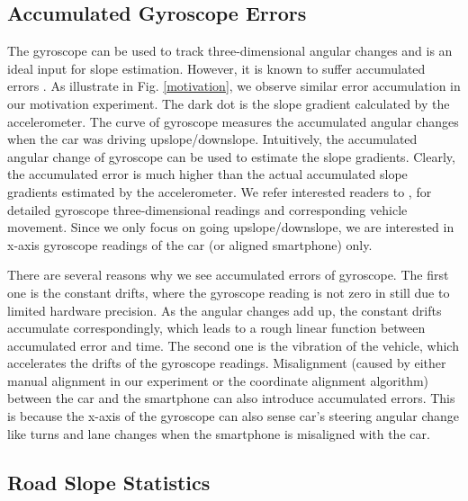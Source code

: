 \subsection{Accumulated Gyroscope Errors}

The gyroscope can be used to track three-dimensional angular changes
and is an ideal input for slope estimation. 
However, it is known to suffer accumulated errors \cite{zhou2014use}. 
As illustrate in Fig. \ref{motivation}, 
we observe similar error accumulation in our motivation experiment. 
The dark dot is the slope gradient calculated by the accelerometer.
The curve of gyroscope measures the accumulated angular changes  
when the car was driving upslope/downslope.
Intuitively, the accumulated angular change of gyroscope can be used to 
estimate the slope gradients.
Clearly, the accumulated error is much higher than 
the actual accumulated slope gradients estimated by the accelerometer. 
We refer interested readers to \cite{chen2015invisible, zhou2014use},  
for detailed gyroscope three-dimensional readings 
and corresponding vehicle movement. 
Since we only focus on going upslope/downslope, we are interested in 
x-axis gyroscope readings of the car (or aligned smartphone) only.

There are several reasons why we see accumulated errors of gyroscope. 
The first one is the constant drifts, where the gyroscope reading is 
not zero in still due to limited hardware precision.
As the angular changes add up, the constant drifts accumulate correspondingly, 
which leads to a rough linear function between accumulated error and time.
The second one is the vibration of the vehicle, which accelerates
the drifts of the gyroscope readings.
Misalignment (caused by either manual alignment in our experiment 
or the coordinate alignment algorithm) between the car and the smartphone can also introduce accumulated errors. 
This is because the x-axis of the gyroscope can also sense car's steering angular change like turns and lane changes
when the smartphone is misaligned with the car.

\subsection{Road Slope Statistics}

